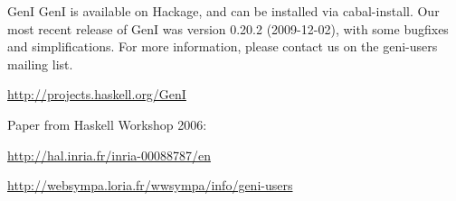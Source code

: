 \begin{hcarentry}[updated]{GenI}
GenI is available on Hackage, and can be installed via cabal-install.
Our most recent release of GenI was version 0.20.2 (2009-12-02), with
some bugfixes and simplifications.  For more information, please contact
us on the geni-users mailing list.

\FurtherReading
\begin{compactitem}
\item \url{http://projects.haskell.org/GenI}
\item Paper from Haskell Workshop 2006:

\url{http://hal.inria.fr/inria-00088787/en}
\item \url{http://websympa.loria.fr/wwsympa/info/geni-users}
\end{compactitem}
\end{hcarentry}
